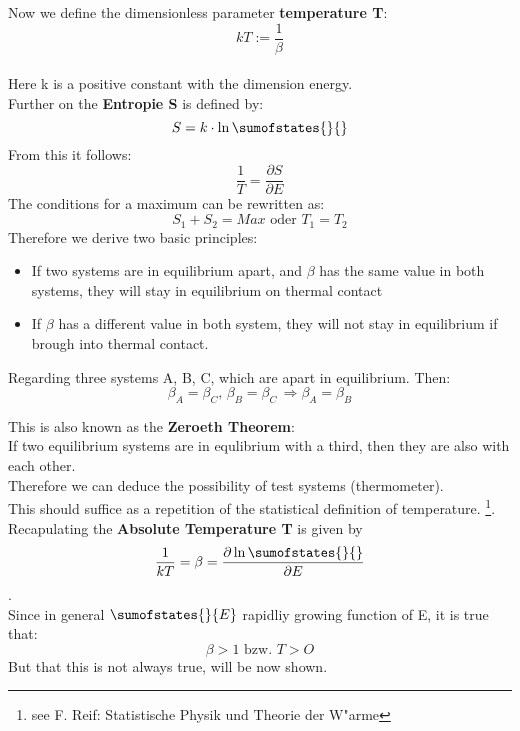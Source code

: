 \documentclass[12pt]{article}
\begin{document}
\begin{module}[id=mytemparature,uses=probability-intro]
Now we define the dimensionless parameter \textbf{temperature T}:
\begin{equation}
kT:=\frac{1}{\beta}
\end{equation} \\
Here k is a positive constant with the dimension energy.\\
Further on the \textbf{Entropie S} is defined by:
\begin{equation}
S=k \cdot \ln\sumofstates{}{}
\end{equation}
From this it follows:
\begin{equation}
\frac{1}{T}=\frac{\partial S}{\partial E}
\end{equation}
The conditions for a maximum can be rewritten as:
\begin{equation}
S_1+S_2=Max \mbox{ oder } T_1=T_2
\end{equation}
Therefore we derive two basic principles:
\begin{itemize}
\item If two systems are in equilibrium apart, and $\beta$ has the same
value in both systems, they will stay in equilibrium on thermal contact
\item If $\beta$ has a different value in both system, they will not
stay in equilibrium if brough into thermal contact.
\end{itemize}

Regarding three systems A, B, C, which are apart in equilibrium.
Then:
\begin{equation}
\beta_A=\beta_C \mbox{, } \beta_B=\beta_C\, \Rightarrow \beta_A=\beta_B
\end{equation}

This is also known as the \textbf{Zeroeth Theorem}:\\[0.5cm]
If two equilibrium systems are in equlibrium with a third, then
they are also with each other.\\[0.5cm]

Therefore we can deduce the possibility of test systems (thermometer).\\
This should suffice as a repetition of the statistical definition of temperature.
\footnote{see F. Reif: Statistische Physik und Theorie der 
W"arme}.
\\
Recapulating the \textbf{Absolute Temperature T} is given by
\begin{equation}
\frac{1}{kT}=\beta=\frac{\partial \ln\sumofstates{}{}}{\partial E}
\end{equation}
.\\
Since in general $\sumofstates{}{E}$ rapidliy growing function of E, 
it is true that: 
\begin{equation}
\beta>1 \mbox{ bzw. } T>O
\end{equation}
But that this is not always true, will be now shown.


\end{module}
\end{document}
